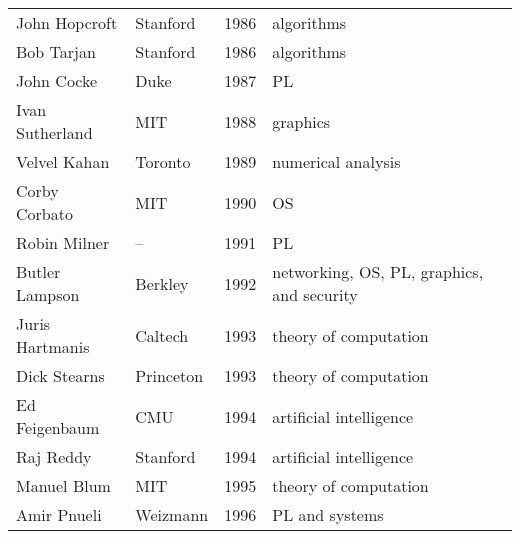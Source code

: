 \documentclass[doublespacing]{utdthesis}
\begin{document}
\begin{table}[p]
\begin{center}
\begin{tabular}{llcp{2.5in}}
  John Hopcroft & Stanford & 1986 & algorithms \\
  Bob Tarjan & Stanford & 1986 & algorithms \\
  John Cocke & Duke & 1987 & PL \\
  Ivan Sutherland & MIT & 1988 & graphics \\
  Velvel Kahan & Toronto & 1989 & numerical analysis \\
  Corby Corbato & MIT & 1990 & OS \\
  Robin Milner & -- & 1991 & PL \\
  Butler Lampson & Berkley & 1992 & networking, OS,
    PL, graphics, and security \\
  Juris Hartmanis & Caltech & 1993 & theory of computation \\
  Dick Stearns & Princeton & 1993 & theory of computation \\
  Ed Feigenbaum & CMU & 1994 & artificial intelligence \\
  Raj Reddy & Stanford & 1994 & artificial intelligence \\
  Manuel Blum & MIT & 1995 & theory of computation \\
  Amir Pnueli & Weizmann & 1996 & PL and systems
  \end{tabular}
  \end{center}
\end{table}
\end{document}

